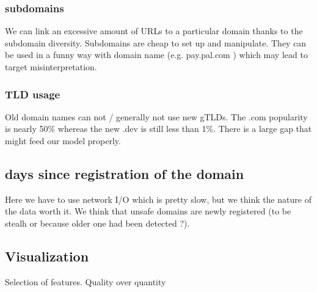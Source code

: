\documentclass[conference,11pt]{IEEEtran}
\begin{document}
\subsubsection{subdomains}
We can link an excessive amount of URLs to a particular domain thanks to the
subdomain diversity. Subdomains are cheap to set up and manipulate. They can be
used in a funny way with domain name (e.g. pay.pal.com ) which may lead to
target misinterpretation.

\subsubsection{TLD usage}
Old domain names can not / generally not use new gTLDs. The .com popularity is
nearly 50\% whereas the new .dev is still less than 1\%. There is a large gap
that might feed our model properly.

\subsection{days since registration of the domain}
Here we have to use network I/O which is pretty slow, but we think the nature of
the data worth it. We think that unsafe domains are newly registered (to be
stealh or because older one had been detected ?).

\subsection{Visualization}
Selection of features. Quality over quantity
\end{document}
